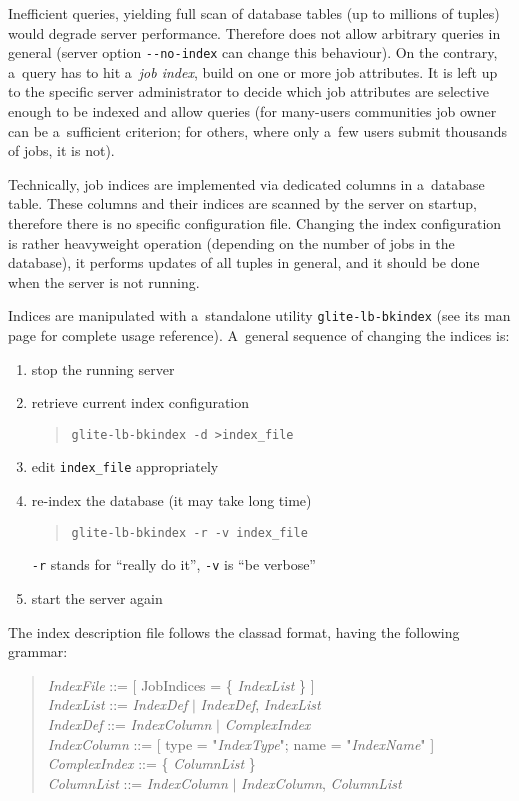 Inefficient queries, yielding full scan of \LB database tables (up to millions of tuples) would degrade server performance.
Therefore \LB does not allow arbitrary queries in general
(server option \verb'--no-index' can change this behaviour).
On the contrary, a~query has to hit a~\emph{job index}, build on one or
more job attributes.
It is left up to the specific \LB server administrator to decide
which job attributes are selective enough to be indexed and allow queries
(\eg for many-users communities job owner can be a~sufficient criterion;
for others, where only a~few users submit thousands of jobs, it is not).

Technically, job indices are implemented via dedicated columns
in a~database table.
These columns and their indices are scanned by the \LB server on startup,
therefore there is no specific configuration file.
Changing the index configuration is rather heavyweight operation
(depending on the number of jobs in the database), it performs
updates of all tuples in general, and it should be done when the server is not
running.

Indices are manipulated with a~standalone utility \verb'glite-lb-bkindex'
(see its man page for complete usage reference).
A~general sequence of changing the indices is:
\begin{enumerate}
\item stop the running server
\item retrieve current index configuration
\begin{quote}
\verb'glite-lb-bkindex -d >index_file'
\end{quote}
\item edit \verb'index_file' appropriately
\item re-index the database (it may take long time)
\begin{quote}
\verb'glite-lb-bkindex -r -v index_file'
\end{quote}
\verb'-r' stands for ``really do it'', \verb'-v' is ``be verbose''
\item start the server again
\end{enumerate}

The index description file follows the classad format, having the following grammar:
\begin{quote}
\emph{IndexFile} ::= [ JobIndices = \{ \emph{IndexList} \} ] \\
\emph{IndexList} ::= \emph{IndexDef} $|$ \emph{IndexDef}, \emph{IndexList} \\
\emph{IndexDef} ::= \emph{IndexColumn} $|$ \emph{ComplexIndex} \\
\emph{IndexColumn} ::= [ type = "\emph{IndexType}"; name = "\emph{IndexName}" ]\\
\emph{ComplexIndex} ::= \{ \emph{ColumnList} \} \\
\emph{ColumnList} ::= \emph{IndexColumn} $|$ \emph{IndexColumn}, \emph{ColumnList}
\end{quote}

